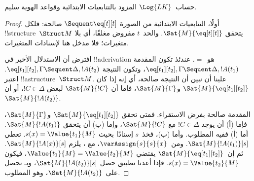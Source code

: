 \documentclass[../../../include/open-logic-section]{subfiles}
\begin{document}


\begin{prop}
حساب~$\Log{LK}$ المزود بالتتابعيات الابتدائية وقواعد الهوية سليم.
\end{prop}

\begin{proof}
أولًا، التتابعيات الابتدائية من الصورة ${} \Sequent \eq[t][t]$ صالحة:
فلكل !!{structure}~$\Struct M$ يتحقق $\Sat{M}{\eq[t][t]}$.
والحد~$t$ مفروض مغلقًا، أي بلا متغيرات؛ فلا مدخل هنا لإسنادات المتغيرات.

افترض أن الاستدلال الأخير في !!a{derivation} هو~$=$. عندئذ تكون المقدمة
$\eq[t_1][t_2], \Gamma \Sequent \Delta, !A(t_1)$، وتكون النتيجة
$\eq[t_1][t_2], \Gamma \Sequent \Delta, !A(t_2)$. اعتبر
!!a{structure}~$\Struct M$. علينا أن نبين أن النتيجة صالحة، أي إنه إذا
كان $\Sat{M}{\eq[t_1][t_2]}$ و$\Sat{M}{\Gamma}$، فإما أن
$\Sat{M}{!C}$ لبعض $!C \in \Delta$، أو أن $\Sat{M}{!A(t_2)}$.

المقدمة صالحة بفرض الاستقراء. فمتى تحقق
$\Sat{M}{\eq[t_1][t_2]}$ و$\Sat{M}{\Gamma}$، فإما (أ) أن يوجد
$!C \in \Delta$ مع $\Sat{M}{!C}$، وإما (ب) أن يتحقق
$\Sat{M}{!A(t_1)}$. أما (أ) ففيه المطلوب.
وأما (ب)، فخذ~$s$ إسنادًا بحيث $s(x) = \Value{t_1}{M}$.
تعطي 
$\Sat{M}{!A(t_1)}[s]$. ومن~$\varAssign{s}{s}{x}$، مع
، يلزم
$\Sat{M}{!A(x)}[s]$.
ثم إن~$\Sat{M}{\eq[t_1][t_2]}$ يقتضي
$\Value{t_1}{M} = \Value{t_2}{M}$، فيكون
$s(x) = \Value{t_2}{M}$.
فإذا أعدنا تطبيق  حصل
$\Sat{M}{!A(t_2)}[s]$، وبـ
 نحصل على~$\Sat{M}{!A(t_2)}$، وهو المطلوب.
\end{proof}
\end{document}
